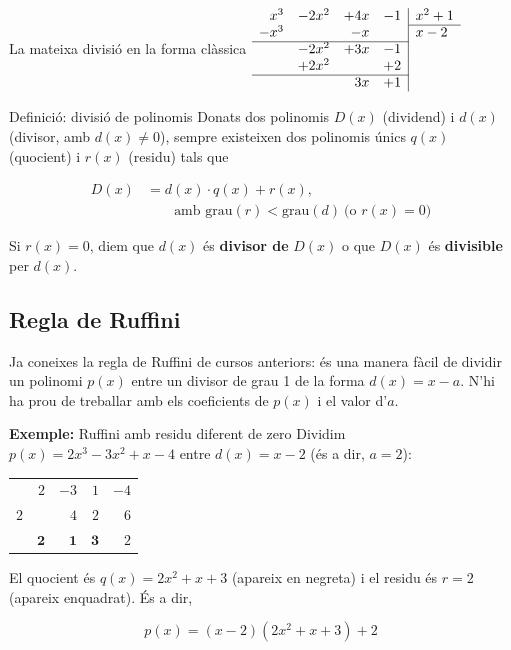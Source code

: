 \begin{figuraapunts}{La mateixa divisió en la forma clàssica}
$\begin{array}{rrrr|l}
x^{3} & -2x^{2} & +4x & -1 & x^{2}+1 \\ \cline{5-5}
-x^{3} &  & -x &  & x-2 \\ \cline{1-4}
 & -2x^{2} & +3x & -1 &  \\
 & +2x^{2} &  & +2 &  \\ \cline{1-4}
 &  & 3x & +1 &  \\
\end{array}$
\end{figuraapunts}

\begin{definicio}{Definició: divisió de polinomis}
Donats dos polinomis $D(x)$ (dividend) i $d(x)$ (divisor, amb $d(x)\neq 0$), sempre existeixen dos polinomis únics $q(x)$ (quocient) i $r(x)$ (residu) tals que

\[
\begin{aligned}
D(x) &= d(x)\cdot q(x) + r(x), \\
&\qquad \text{amb } \text{grau}(r) < \text{grau}(d) \ \text{(o } r(x)=0\text{)}
\end{aligned}
\]

Si $r(x)=0$, diem que $d(x)$ és \textbf{divisor de} $D(x)$ o que $D(x)$ és \textbf{divisible} per $d(x)$.
\end{definicio}

\subsection{Regla de Ruffini}

Ja coneixes la regla de Ruffini de cursos anteriors: és una manera fàcil de dividir un polinomi $p(x)$ entre un divisor de grau 1 de la forma $d(x)=x-a$. N'hi ha prou de treballar amb els coeficients de $p(x)$ i el valor d'$a$.

\begin{exemple}{\textbf{Exemple:} Ruffini amb residu diferent de zero}
Dividim $p(x) = 2x^3-3x^2+x-4$ entre $d(x)=x-2$ (és a dir, $a=2$):

\begin{center}
\renewcommand{\arraystretch}{1.25}
\begin{tabular}{r|rrrr}
 & $2$ & $-3$ & $1$ & $-4$ \\
$2$ &  & $4$ & $2$ & $6$ \\ \hline
 & $\textbf{2}$ & $\textbf{1}$ & $\textbf{3}$ & $\boxed{2}$ \\
\end{tabular}
\end{center}

El quocient és $q(x)=2x^2+x+3$ (apareix en negreta) i el residu és $r=2$ (apareix enquadrat). És a dir,

\[
p(x) = (x-2)(2x^2+x+3) + 2
\]
\end{exemple}


